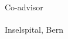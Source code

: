\begin{titlepage}
\begin{center}
		\large{Co-advisor \\ \examname \\ Inselspital, Bern}\vspace{0.5cm}
		
	\end{center}
\end{titlepage}
\cleardoublepage






